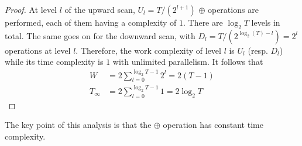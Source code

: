 \documentclass{article}
\begin{document}
\begin{proof}
At level $l$ of the upward scan, $U_l = T/(2^{l+1})$ $\oplus$ operations are performed, each of them having a complexity of $1$. There are $\log_2 T$ levels in total. The same goes on for the downward scan, with $D_l = T/(2^{\log_2(T) - l})=2^{l}$ operations at level $l$. Therefore, the work complexity of level $l$ is $U_l$ (resp. $D_l$) while its time complexity is $1$ with unlimited parallelism. It follows that
\begin{align}
\label{eq:W_integer}
W &= 2\sum_{l=0}^{\log_2 T-1}2^l=2(T-1)\\
\label{eq:T_integer}
T_\infty&= 2\sum_{l=0}^{\log_2 T-1}1=2\log_2T
\end{align}
\end{proof}
The key point of this analysis is that the $\oplus$ operation has constant time complexity.
\end{document}
